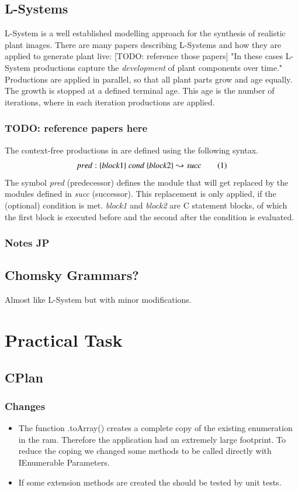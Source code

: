 \documentclass[11pt, a4paper]{report}
\newcommand\addtag{\refstepcounter{equation}\tag{\theequation}}
\begin{document}
\section{L-Systems}

L-System is a well established modelling approach for the synthesis of realistic plant images. There are many papers describing L-Systems and how they are applied to generate plant live: [TODO: reference those papers] "In these cases L-System productions capture the \textit{development} of plant components over time." \citep{PrusinkiewiczEtAl:2001} Productions are applied in parallel, so that all plant parts grow and age equally. The growth is stopped at a defined terminal age. This age is the number of iterations, where in each iteration productions are applied.
\subsection{TODO: reference papers here}
The context-free productions in \citep{PrusinkiewiczEtAl:2001} are defined using the following syntax.
\[
pred : \{block1\}\ cond\ \{block2\} \leadsto succ \addtag
\]
The symbol \textit{pred} (predecessor) defines the module that will get replaced by the modules defined in \textit{succ} (successor). This replacement is only applied, if the (optional) condition is met. \textit{block1} and \textit{block2} are C statement blocks, of which the first block is executed before and the second after the condition is evaluated.
\subsection{Notes JP}

\pagebreak
\section{Chomsky Grammars?}
\citep{PrusinkiewiczEtAl:2001}
Almost like L-System but with minor modifications.

\pagebreak
\chapter{Practical Task}
\section{CPlan}
\subsection{Changes}
\begin{itemize}
    \item The function .toArray() creates a complete copy of the existing enumeration in the ram. Therefore the application had an extremely large footprint. To reduce the coping we changed some methods to be called directly with IEnumerable Parameters.
    \item If some extension methods are created the should be tested by unit tests.
\end{itemize}
\end{document}
